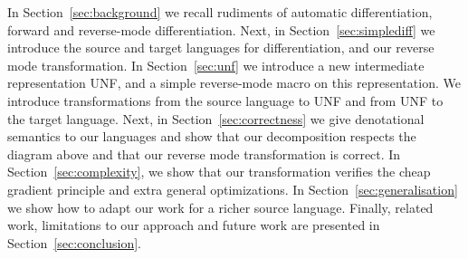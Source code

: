 In Section~\ref{sec:background} we recall rudiments of automatic differentiation, forward and reverse-mode differentiation.
Next, in Section~\ref{sec:simplediff} we introduce the source and target languages for differentiation, and our reverse mode transformation. 
In Section~\ref{sec:unf} we introduce a new intermediate representation UNF, and a simple reverse-mode macro on this representation.
We introduce transformations from the source language to UNF and from UNF to the target language.
Next, in Section~\ref{sec:correctness} we give denotational semantics to our languages and show that our decomposition respects the diagram above and that our reverse mode transformation is correct.
In Section~\ref{sec:complexity}, we show that our transformation verifies the cheap gradient principle and extra general optimizations.
In Section~\ref{sec:generalisation} we show how to adapt our work for a richer source language. 
Finally, related work, limitations to our approach and future work are presented in Section~\ref{sec:conclusion}.
